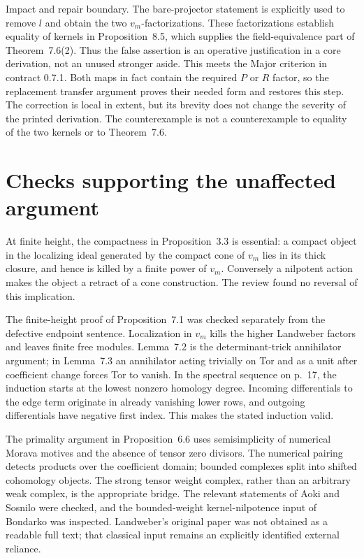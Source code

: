 \documentclass[10pt]{article}
\begin{document}
Impact and repair boundary. The bare-projector statement is explicitly used to remove \(l\) and obtain the two \(v_m\)-factorizations. These factorizations establish equality of kernels in Proposition 8.5, which supplies the field-equivalence part of Theorem 7.6(2). Thus the false assertion is an operative justification in a core derivation, not an unused stronger aside. This meets the Major criterion in contract 0.7.1. Both maps in fact contain the required \(P\) or \(R\) factor, so the replacement transfer argument proves their needed form and restores this step. The correction is local in extent, but its brevity does not change the severity of the printed derivation. The counterexample is not a counterexample to equality of the two kernels or to Theorem 7.6.\par
\section*{Checks supporting the unaffected argument}
At finite height, the compactness in Proposition 3.3 is essential: a compact object in the localizing ideal generated by the compact cone of \(v_m\) lies in its thick closure, and hence is killed by a finite power of \(v_m\). Conversely a nilpotent action makes the object a retract of a cone construction. The review found no reversal of this implication.\par
The finite-height proof of Proposition 7.1 was checked separately from the defective endpoint sentence. Localization in \(v_m\) kills the higher Landweber factors and leaves finite free modules. Lemma 7.2 is the determinant-trick annihilator argument; in Lemma 7.3 an annihilator acting trivially on Tor and as a unit after coefficient change forces Tor to vanish. In the spectral sequence on p. 17, the induction starts at the lowest nonzero homology degree. Incoming differentials to the edge term originate in already vanishing lower rows, and outgoing differentials have negative first index. This makes the stated induction valid.\par
The primality argument in Proposition 6.6 uses semisimplicity of numerical Morava motives and the absence of tensor zero divisors. The numerical pairing detects products over the coefficient domain; bounded complexes split into shifted cohomology objects. The strong tensor weight complex, rather than an arbitrary weak complex, is the appropriate bridge. The relevant statements of Aoki and Sosnilo were checked, and the bounded-weight kernel-nilpotence input of Bondarko was inspected. Landweber’s original paper was not obtained as a readable full text; that classical input remains an explicitly identified external reliance.\par
\end{document}
